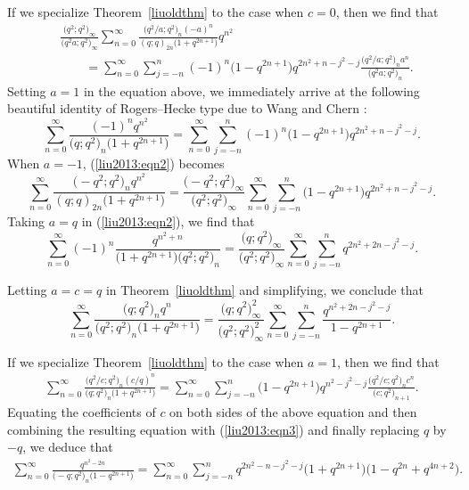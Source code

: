 \documentclass[pdftex]{sigma}
\numberwithin{equation}{section}
\begin{document}
If we specialize Theorem~\ref{liuoldthm} to the case when $c=0$, then we find that
\begin{align}
	&\frac{\bigl(q^2; q^2\bigr)_\infty}{\bigl(q^2a; q^2\bigr)_\infty}\sum_{n=0}^\infty
	\frac{\bigl(q^2/a; q^2\bigr)_n (-a)^n }{(q; q)_{2n} \bigl(1+q^{2n+1}\bigr)}q^{n^2} \nonumber\\
	&\qquad{}=\sum_{n=0}^\infty \sum_{j=-n}^n (-1)^n\bigl(1-q^{2n+1}\bigr) q^{2n^2+n-j^2-j}
	\frac{\bigl(q^2/a; q^2\bigr)_n a^n}{\bigl(q^2a; q^2\bigr)_n}.\label{liu2013:eqn2}
\end{align}
Setting $a=1$ in the equation above, we immediately arrive at the following beautiful identity of Rogers--Hecke type due to Wang and Chern \cite[equation~(2.9)]{WangChern2019}:
\begin{equation}\label{liu2013:eqn3}
	\sum_{n=0}^\infty \frac{(-1)^n q^{n^2}}{\bigl(q; q^2\bigr)_n \bigl(1+q^{2n+1}\bigr)}
	=\sum_{n=0}^\infty \sum_{j=-n}^n (-1)^n \bigl(1-q^{2n+1}\bigr) q^{2n^2+n-j^2-j}.
\end{equation}
When $a=-1$, (\ref{liu2013:eqn2}) becomes
\begin{equation*}%
	\sum_{n=0}^\infty
	\frac{\bigl(-q^2; q^2\bigr)_n q^{n^2}}{(q; q)_{2n} \bigl(1+q^{2n+1}\bigr)}
	=\frac{\bigl(-q^2; q^2\bigr)_\infty}{\bigl(q^2; q^2\bigr)_\infty}
	\sum_{n=0}^\infty \sum_{j=-n}^n \bigl(1-q^{2n+1}\bigr) q^{2n^2+n-j^2-j}.
\end{equation*}
Taking $a=q$ in (\ref{liu2013:eqn2}), we find that
\begin{equation*}%
	\sum_{n=0}^\infty (-1)^n \frac{q^{n^2+n}}{\bigl(1+q^{2n+1}\bigr)\bigl(q^2; q^2\bigr)_n}
	=\frac{\bigl(q; q^2\bigr)_\infty}{\bigl(q^2; q^2\bigr)_\infty}
	\sum_{n=0}^\infty \sum_{j=-n}^n q^{2n^2+2n-j^2-j}.
\end{equation*}

Letting $a=c=q$ in Theorem~\ref{liuoldthm} and simplifying, we conclude that
\begin{equation*}%
	\sum_{n=0}^\infty\frac{\bigl(q; q^2\bigr)_n q^n}{\bigl(q^2; q^2\bigr)_n \bigl(1+q^{2n+1}\bigr)}
	=\frac{\bigl(q; q^2\bigr)_\infty^2}{\bigl(q^2; q^2\bigr)^2_\infty}
	\sum_{n=0}^\infty \sum_{j=-n}^n \frac{q^{n^2+2n-j^2-j}}{1-q^{2n+1}}.
\end{equation*}

If we specialize Theorem~\ref{liuoldthm} to the case when $a=1$, then we find that
\begin{align*} %
	\sum_{n=0}^\infty \frac{\bigl(q^2/c; q^2\bigr)_n (c/q)^n}{\bigl(q; q^2\bigr)_n \bigl(1+q^{2n+1}\bigr)}
	=\sum_{n=0}^\infty \sum_{j=-n}^n \bigl(1-q^{2n+1}\bigr) q^{n^2-j^2-j} \frac{\bigl(q^2/c; q^2\bigr)_n c^n}{\bigl(c; q^2\bigr)_{n+1}}.
\end{align*}
Equating the coefficients of $c$ on both sides of the above equation and then combining the resulting equation with (\ref{liu2013:eqn3}) and finally replacing $q$ by $-q$, we deduce that
\begin{align*}
\sum_{n=0}^{\infty} \frac{ q^{n^2-2n}}{\bigl(-q; q^2\bigr)_n \bigl(1-q^{2n+1}\bigr)}
=\sum_{n=0}^{\infty} \sum_{j=-n}^{n} q^{2n^2-n-j^2-j}\bigl(1+q^{2n+1}\bigr)\bigl(1-q^{2n}+q^{4n+2}\bigr).
\end{align*}
\end{document}
